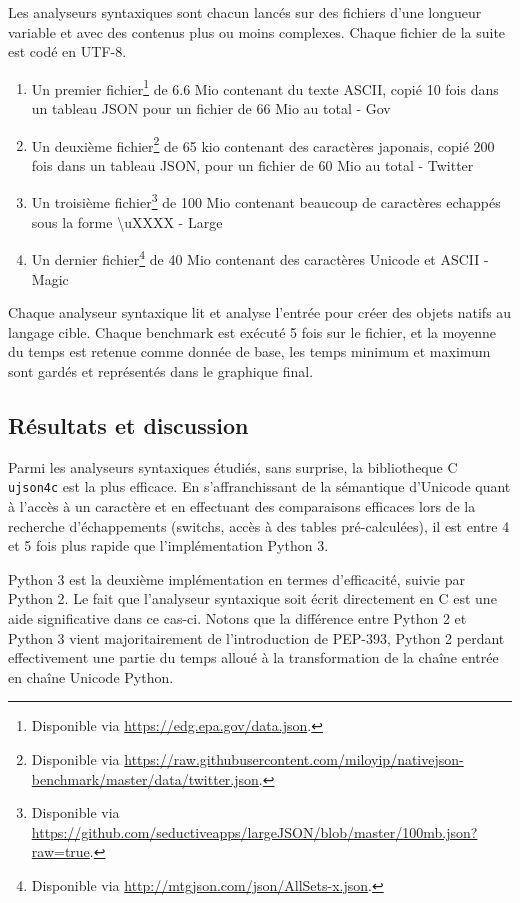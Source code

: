 Les analyseurs syntaxiques sont chacun lancés sur des fichiers d'une longueur variable et avec des contenus plus ou
moins complexes.
Chaque fichier de la suite est codé en UTF-8.

\begin{enumerate}
	\item Un premier fichier\footnote{Disponible via \url{https://edg.epa.gov/data.json}.} de 6.6 Mio contenant du texte ASCII, copié 10 fois dans un tableau JSON pour un fichier de 66 Mio au total - Gov
	\item Un deuxième fichier\footnote{Disponible via \url{https://raw.githubusercontent.com/miloyip/nativejson-benchmark/master/data/twitter.json}.} de 65 kio contenant des caractères japonais, copié 200 fois dans un tableau JSON, pour un fichier de 60 Mio au total - Twitter
	\item Un troisième fichier\footnote{Disponible via \url{https://github.com/seductiveapps/largeJSON/blob/master/100mb.json?raw=true}.} de 100 Mio contenant beaucoup de caractères echappés sous la forme \textbackslash uXXXX - Large
	\item Un dernier fichier\footnote{Disponible via \url{http://mtgjson.com/json/AllSets-x.json}.} de 40 Mio contenant des caractères Unicode et ASCII - Magic
\end{enumerate}

Chaque analyseur syntaxique lit et analyse l'entrée pour créer des objets natifs au langage cible.
Chaque benchmark est exécuté 5 fois sur le fichier, et la moyenne du temps est retenue comme donnée de base, les
temps minimum et maximum sont gardés et représentés dans le graphique final.

\subsection{Résultats et discussion}

Parmi les analyseurs syntaxiques étudiés, sans surprise, la bibliotheque C \texttt{ujson4c} est la plus efficace.
En s'affranchissant de la sémantique d'Unicode quant à l'accès à un caractère et en effectuant des comparaisons
efficaces lors de la recherche d'échappements (switchs, accès à des tables pré-calculées), il est entre 4 et 5
fois plus rapide que l'implémentation Python 3.

Python 3 est la deuxième implémentation en termes d'efficacité, suivie par Python 2.
Le fait que l'analyseur syntaxique soit écrit directement en C est une aide significative dans ce cas-ci.
Notons que la différence entre Python 2 et Python 3 vient majoritairement de l'introduction de PEP-393, Python
2 perdant effectivement une partie du temps alloué à la transformation de la chaîne entrée en chaîne Unicode
Python.

